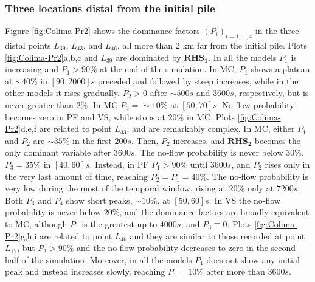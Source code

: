 \documentclass{article}
\begin{document}
\subsubsection{Three locations distal from the initial pile}
Figure \ref{fig:Colima-Pr2} shows the dominance factors $(P_i)_{i=1,\dots,4}$ in the three distal points $L_{39}$, $L_{43}$, and $L_{46}$, all more than 2 km far from the initial pile. Plots \ref{fig:Colima-Pr2}a,b,c and $L_{39}$ are dominated by $\boldsymbol{RHS_1}$. In all the models $P_1$ is increasing and $P_1>90\%$ at the end of the simulation. In MC, $P_1$ shows a plateau at $\sim 40\%$ in $[90,2000] s$ preceded and followed by steep increases, while in the other models it rises gradually. $P_2>0$ after $\sim 500 s$ and $3600 s$, respectively, but is never greater than $2\%$. In MC $P_3=\sim 10\%$ at $[50,70] s$. No-flow probability becomes zero in PF and VS, while stops at $20\%$ in MC. Plots \ref{fig:Colima-Pr2}d,e,f are related to point $L_{43}$, and are remarkably complex. In MC, either $P_1$ and $P_2$ are $\sim 35\%$ in the first $200 s$. Then, $P_2$ increases, and $\boldsymbol{RHS_2}$ becomes the only dominant variable after $3600 s$. The no-flow probability is never below $30\%$. $P_3=35\%$ in $[40, 60] s$. Instead, in PF $P_1>90\%$ until $3600 s$, and $P_2$ rises only in the very last amount of time, reaching $P_2=P_1=40\%$. The no-flow probability is very low during the most of the temporal window, rising at $20\%$ only at $7200 s$. Both $P_3$ and $P_4$ show short peaks, $\sim 10\%$, at $[50,60] s$. In VS the no-flow probability is never below $20\%$, and the dominance factors are broadly equivalent to MC, although $P_1$ is the greatest up to $4000 s$, and $P_3\equiv0$. Plots \ref{fig:Colima-Pr2}g,h,i are related to point $L_{46}$ and they are similar to those recorded at point $L_{17}$, but $P_2>90\%$ and the no-flow probability decreases to zero in the second half of the simulation. Moreover, in all the models $P_1$ does not show any initial peak and instead increases slowly, reaching $P_1=10\%$ after more than $3600 s$.
\end{document}

